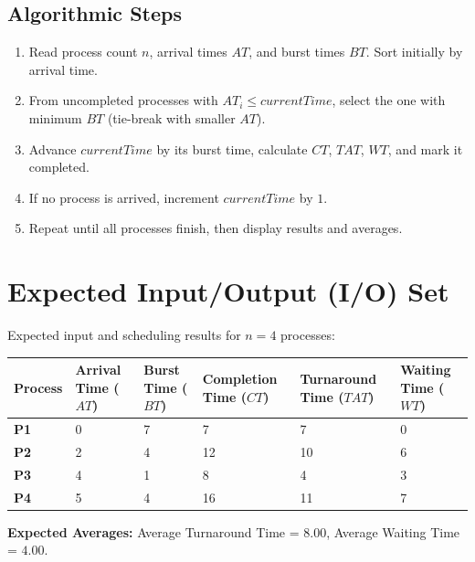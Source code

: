 \documentclass[10pt,a4paper]{article}
\begin{document}
\subsection{Algorithmic Steps}
\begin{enumerate}[noitemsep,topsep=1pt,leftmargin=1.4em]
  \item Read process count $n$, arrival times $AT$, and burst times $BT$. Sort initially by arrival time.
  \item From uncompleted processes with $AT_i \le currentTime$, select the one with minimum $BT$ (tie-break with smaller $AT$).
  \item Advance $currentTime$ by its burst time, calculate $CT$, $TAT$, $WT$, and mark it completed.
  \item If no process is arrived, increment $currentTime$ by $1$.
  \item Repeat until all processes finish, then display results and averages.
\end{enumerate}

\section{Expected Input/Output (I/O) Set}
Expected input and scheduling results for $n = 4$ processes:

\vspace{-2pt}
\begin{table}[h!]
\centering\footnotesize
\renewcommand{\arraystretch}{1.08}
\begin{tabularx}{\linewidth}{YYYYYY}
\toprule
\textbf{Process} & \textbf{Arrival Time ($AT$)} & \textbf{Burst Time ($BT$)} & \textbf{Completion Time ($CT$)} & \textbf{Turnaround Time ($TAT$)} & \textbf{Waiting Time ($WT$)} \\
\midrule
\textbf{P1} & 0 & 7 & 7  & 7  & 0 \\
\textbf{P2} & 2 & 4 & 12 & 10 & 6 \\
\textbf{P3} & 4 & 1 & 8  & 4  & 3 \\
\textbf{P4} & 5 & 4 & 16 & 11 & 7 \\
\bottomrule
\end{tabularx}
\end{table}
\vspace{-6pt}

\noindent\textbf{Expected Averages:} Average Turnaround Time = $8.00$, Average Waiting Time = $4.00$.
\end{document}
